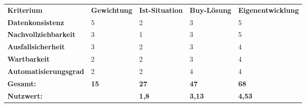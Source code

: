\begin{tabular}{lllll}
\rowcolor{heading}\textbf{Kriterium} & \textbf{Gewichtung} & \textbf{Ist-Situation} & \textbf{Buy-Lösung} & \textbf{Eigenentwicklung}\\
\textbf{Datenkonsistenz}                   & 5 & 2 & 3 & 5 \\
\rowcolor{odd}\textbf{Nachvollziehbarkeit} & 3 & 1 & 3 & 5 \\
\textbf{Ausfallsicherheit}                 & 3 & 2 & 3 & 4 \\
\rowcolor{odd}\textbf{Wartbarkeit}         & 2 & 2 & 3 & 4 \\
\textbf{Automatisierungsgrad}              & 2 & 2 & 4 & 4 \\
\rowcolor{heading}\textbf{Gesamt:}         & \textbf{15} & \textbf{27} & \textbf{47} & \textbf{68}\\
\rowcolor{odd}\textbf{Nutzwert:}           & & \textbf{1,8} & \textbf{3,13} & \textbf{4,53}\\
\end{tabular}